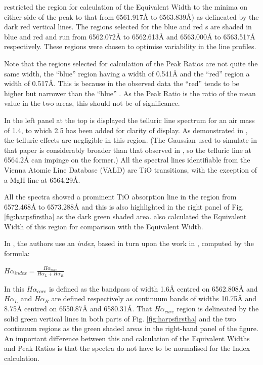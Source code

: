 {\FirstP} restricted the {\ha} region for calculation of the Equivalent Width to the minima on either side of the peak
to that from 6561.917{\AA} to 6563.839\AA) as delineated by the dark red vertical lines. The regions selected for the
blue and red \horn s are shaded in blue and red and run from 6562.072{\AA} to 6562.613{\AA} and 6563.000{\AA} to
6563.517{\AA} respectively. These regions were chosen to optimise variability in the line profiles.

Note that the regions selected for calculation of the Peak Ratios are not quite the same width, the ``blue'' \horn{}
region having a width of 0.541{\AA} and the ``red'' {\horn} region a width of 0.517\AA. This is because in the observed
data the ``red'' {\horn} tends to be higher but narrower than the ``blue'' \horn. As the Peak Ratio is the ratio of the
mean value in the two areas, this should not be of significance.

In the left panel at the top is displayed the telluric line spectrum for an air mass of 1.4, to which 2.5 has been added
for clarity of display. As demonstrated in \citet[Fig. 1]{reiners15}, the telluric effects are negligible in this
region. (The Gaussian used to simulate {\ha} in that paper is considerably broader than that observed in \prox, so the
telluric line at 6564.2{\AA} can impinge on the former.) All the spectral lines identifiable from the Vienna Atomic Line
Database (VALD) are TiO transitions, with the exception of a MgH line at 6564.29\AA.

All the spectra showed a prominent TiO absorption line in the region from 6572.468{\AA} to 6573.288{\AA} and this is
also highlighted in the right panel of Fig. \ref{fig:harpsfirstha} as the dark green shaded area. {\FirstP} also
calculated the Equivalent Width of this region for comparison with the {\ha} Equivalent Width.

In \citet{suarezmascareno15}, the authors use an \textit{{\ha} index}, based in turn upon the work in
\citet{gomesdasilva11}, computed by the formula:

\begin{center}

$ H\alpha_{index} = \frac{H\alpha_{core}}{H\alpha_L + H\alpha_R} $

\end{center}

In this $ H\alpha_{core} $ is defined as the bandpass of width 1.6{\AA} centred on 6562.808{\AA} and $ H\alpha_L $ and
$H \alpha_R $ are defined respectively as continuum bands of widths 10.75{\AA} and 8.75{\AA} centred on 6550.87{\AA} and
6580.31\AA. That $ H\alpha_{core} $ region is delineated by the solid green vertical lines in both parts of
Fig. \ref{fig:harpsfirstha} and the two continuum regions as the green shaded areas in the right-hand panel of the
figure. An important difference between this and calculation of the Equivalent Widths and Peak Ratios is that the
spectra do not have to be normalised for the {\ha} Index calculation.

